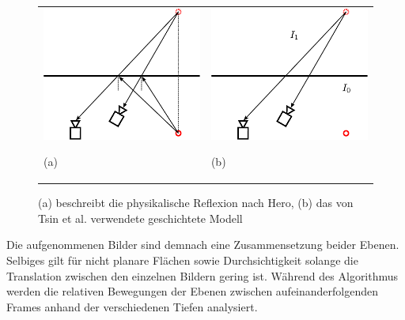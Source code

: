 \begin{figure}[h]
  	\centering
	\begin{tabular}{m{6.5cm} m{6.5cm}}
	\includegraphics[width=6.5cm]{img/reflection_model_hero.pdf}
	\begin{center} \small (a) \end{center}
	&
	\includegraphics[width=6.5cm]{img/reflection_model_layers.pdf}
	\begin{center} \small (b) \end{center}
	\end{tabular}
\caption{(a) beschreibt die physikalische Reflexion nach Hero, (b) das von Tsin et al. verwendete geschichtete Modell}
\label{fig:reflection}
\end{figure}

\noindent
Die aufgenommenen Bilder sind demnach eine Zusammensetzung beider Ebenen. Selbiges gilt für nicht planare Flächen sowie Durchsichtigkeit solange die Translation zwischen den einzelnen Bildern gering ist. Während des Algorithmus werden die relativen Bewegungen der Ebenen zwischen aufeinanderfolgenden Frames anhand der verschiedenen Tiefen analysiert.\\

